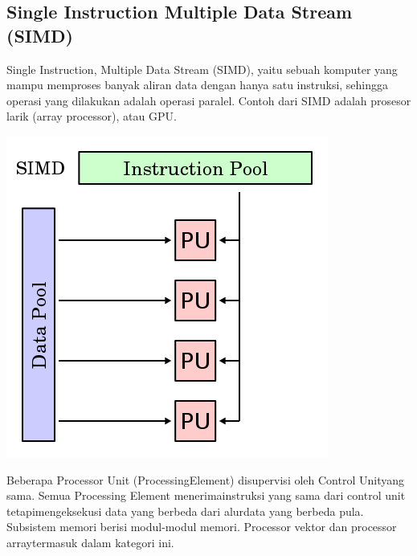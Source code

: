 \documentclass[a4paper,12pt]{article}
\begin{document}
\subsection{Single Instruction Multiple Data Stream (SIMD)}
Single Instruction, Multiple Data Stream (SIMD), yaitu sebuah komputer yang mampu memproses banyak aliran data dengan hanya satu instruksi, sehingga operasi yang dilakukan adalah operasi paralel. Contoh dari SIMD adalah prosesor larik (array processor), atau GPU.
\begin{center}
    \includegraphics[width=0.8\linewidth]{simd.png}
\end{center}
Beberapa Processor Unit (ProcessingElement) disupervisi oleh Control Unityang sama.
Semua Processing Element menerimainstruksi yang sama dari control unit tetapimengeksekusi data yang berbeda dari alurdata yang berbeda pula.
Subsistem memori berisi modul-modul memori.
Processor vektor dan processor arraytermasuk dalam kategori ini.
\end{document}
